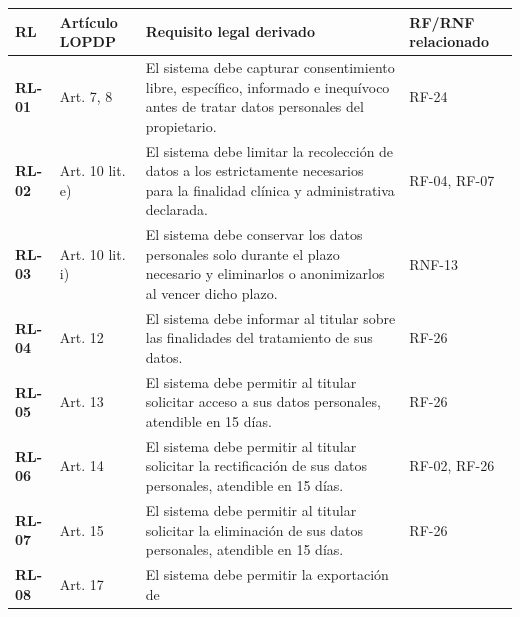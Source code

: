 {\def\LTcaptype{none} %
\begin{longtable}[]{@{}
  >{\raggedright\arraybackslash}p{}
  >{\raggedright\arraybackslash}p{}
  >{\raggedright\arraybackslash}p{}
  >{\raggedright\arraybackslash}p{}@{}}
\toprule\noalign{}
\begin{minipage}[b]{\linewidth}\raggedright
\textbf{RL}
\end{minipage} & \begin{minipage}[b]{\linewidth}\raggedright
\textbf{Artículo LOPDP}
\end{minipage} & \begin{minipage}[b]{\linewidth}\raggedright
\textbf{Requisito legal derivado}
\end{minipage} & \begin{minipage}[b]{\linewidth}\raggedright
\textbf{RF/RNF relacionado}
\end{minipage} \\
\midrule\noalign{}
\endhead
\bottomrule\noalign{}
\endlastfoot
\textbf{RL-01} & Art. 7, 8 & El sistema debe capturar consentimiento
libre, específico, informado e inequívoco antes de tratar datos
personales del propietario. & RF-24 \\
\textbf{RL-02} & Art. 10 lit. e) & El sistema debe limitar la
recolección de datos a los estrictamente necesarios para la finalidad
clínica y administrativa declarada. & RF-04, RF-07 \\
\textbf{RL-03} & Art. 10 lit. i) & El sistema debe conservar los datos
personales solo durante el plazo necesario y eliminarlos o anonimizarlos
al vencer dicho plazo. & RNF-13 \\
\textbf{RL-04} & Art. 12 & El sistema debe informar al titular sobre las
finalidades del tratamiento de sus datos. & RF-26 \\
\textbf{RL-05} & Art. 13 & El sistema debe permitir al titular solicitar
acceso a sus datos personales, atendible en 15 días. & RF-26 \\
\textbf{RL-06} & Art. 14 & El sistema debe permitir al titular solicitar
la rectificación de sus datos personales, atendible en 15 días. & RF-02,
RF-26 \\
\textbf{RL-07} & Art. 15 & El sistema debe permitir al titular solicitar
la eliminación de sus datos personales, atendible en 15 días. & RF-26 \\
\textbf{RL-08} & Art. 17 & El sistema debe permitir la exportación de

\end{longtable}}

